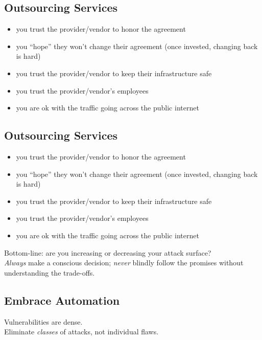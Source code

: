 \documentclass[xga]{xdvislides}
\begin{document}
\subsection{Outsourcing Services}
\begin{itemize}
	\item you trust the provider/vendor to honor the agreement
	\item you ``hope'' they won't change their agreement (once
		invested, changing back is hard)
	\item you trust the provider/vendor to keep their infrastructure
		safe
	\item you trust the provider/vendor's employees
	\item you are ok with the traffic going across the public internet
\end{itemize}

\subsection{Outsourcing Services}
\begin{itemize}
	\item you trust the provider/vendor to honor the agreement
	\item you ``hope'' they won't change their agreement (once
		invested, changing back is hard)
	\item you trust the provider/vendor to keep their infrastructure
		safe
	\item you trust the provider/vendor's employees
	\item you are ok with the traffic going across the public internet
\end{itemize}
\addvspace{.5in}
Bottom-line: are you increasing or decreasing your
attack surface? \\

\addvspace{.25in}
{\em Always} make a conscious decision; {\em never} blindly follow
the promises without understanding the trade-offs.

\subsection{Embrace Automation}
\vspace*{\fill}
\Huge
\begin{center}
	Vulnerabilities are dense. \\
\addvspace{.5in}
	Eliminate {\em classes} of attacks, not
	individual flaws. \\
\end{center}
\Normalsize
\vspace*{\fill}
\end{document}
